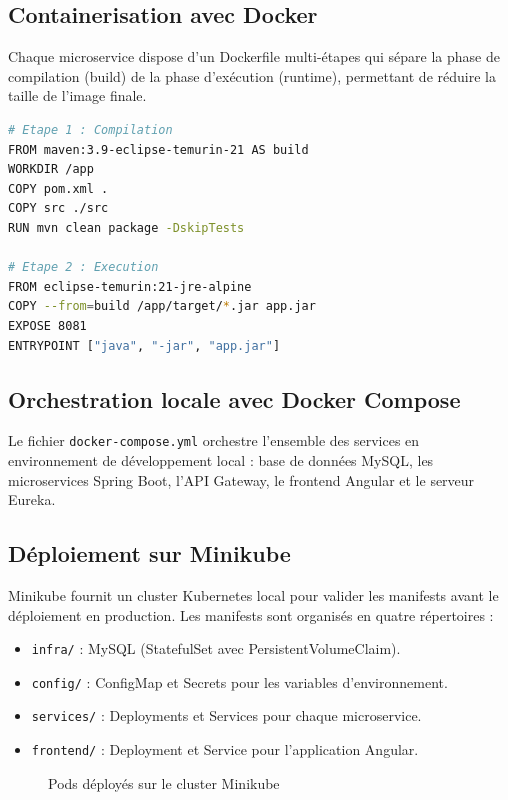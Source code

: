 \subsection{Containerisation avec Docker}

Chaque microservice dispose d'un Dockerfile multi-étapes qui sépare la phase de compilation (build) de la phase d'exécution (runtime), permettant de réduire la taille de l'image finale.

\begin{lstlisting}[language=bash, caption={Exemple de Dockerfile multi-étapes}, label={lst:dockerfile}]
# Etape 1 : Compilation
FROM maven:3.9-eclipse-temurin-21 AS build
WORKDIR /app
COPY pom.xml .
COPY src ./src
RUN mvn clean package -DskipTests

# Etape 2 : Execution
FROM eclipse-temurin:21-jre-alpine
COPY --from=build /app/target/*.jar app.jar
EXPOSE 8081
ENTRYPOINT ["java", "-jar", "app.jar"]
\end{lstlisting}

\subsection{Orchestration locale avec Docker Compose}
Le fichier \texttt{docker-compose.yml} orchestre l'ensemble des services en environnement de développement local : base de données MySQL, les microservices Spring Boot, l'API Gateway, le frontend Angular et le serveur Eureka.

\subsection{Déploiement sur Minikube}
Minikube fournit un cluster Kubernetes local pour valider les manifests avant le déploiement en production. Les manifests sont organisés en quatre répertoires :
\begin{itemize}
    \item \texttt{infra/} : MySQL (StatefulSet avec PersistentVolumeClaim).
    \item \texttt{config/} : ConfigMap et Secrets pour les variables d'environnement.
    \item \texttt{services/} : Deployments et Services pour chaque microservice.
    \item \texttt{frontend/} : Deployment et Service pour l'application Angular.
\end{itemize}

\begin{figure}[H]
    \centering
    \caption{Pods déployés sur le cluster Minikube}
    \label{fig:minikube_pods}
\end{figure}

